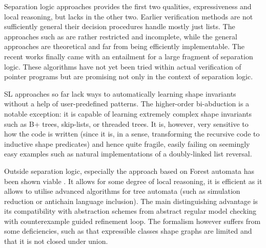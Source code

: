 {Separation logic approaches provides the first two qualities, 
expressiveness and local reasoning,
but lacks in the other two. 
%
Earlier verification methods are not sufficiently general their decision procedures handle mostly just lists. The approaches such as \cite{iosif_deciding_2014,enea_compositional_2014,ruzica_automating} are rather restricted and incomplete, while the general approaches \cite{iosif_treewidth_2013,matheja_treelike_2015} are theoretical and far from being efficiently implementable.
%
The recent works \cite{Katelaan:seplog,pagel,Iosif:CSL,Iosif:LPAR} finally came with an entailment for a large fragment of separation logic. These algorithms have not yet been tried within actual verification of pointer programs but are promising not only in the context of separation logic.

SL approaches so far lack ways to automatically learning shape invariants without a help of user-predefined patterns. 
%
The higher-order bi-abduction \cite{locle:secondorder} is a notable exception: it is capable of learning extremely complex shape invariants such as B+ trees, skip-lists, or threaded trees. 
%
It is, however, very sensitive to how the code is written (since it is, in a sense, transforming the recursive code to inductive shape predicates) and hence quite fragile, easily failing on seemingly easy examples such as natural implementations of a doubly-linked list reversal. 

Outside separation logic, especially the approach based on Forest automata \cite{forester11,forester12,holik_boxes_2013,vmcai17} has been shown viable \cite{svcomp15-forester,holik_run_2016,holik_forester_2017}. It allows for some degree of local reasoning, it is efficient as it allows to utilise advanced algorithms for tree automata (such as simulation reduction or antichain language inclusion). The main distinguishing advantage is its compatibility with abstraction schemes from abstract regular model checking \cite{svcomp15-forester} with counterexample guided refinement loop. The formalism however suffers from some deficiencies, such as that expressible classes shape graphs are limited and that it is not closed under union.

}
